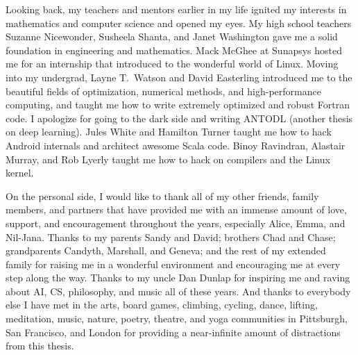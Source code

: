 \begin{acknowledgments}
    Looking back, my teachers and mentors earlier in my life
    ignited my interests in mathematics and computer science
    and opened my eyes.
    My high school teachers
    Suzanne Nicewonder,
    Susheela Shanta, and
    Janet Washington gave me a solid foundation
    in engineering and mathematics.
    Mack McGhee at Sunapsys hosted me for an
    internship that introduced to the wonderful
    world of Linux.
    Moving into my undergrad,
    Layne T.~Watson and David Easterling
    introduced me to the beautiful fields
    of optimization, numerical methods, and
    high-performance computing, and taught me how to
    write extremely optimized and robust Fortran code.
    I apologize for going to the dark side and writing
    ANTODL (another thesis on deep learning).
    Jules White and Hamilton Turner taught me how
    to hack Android internals and architect awesome Scala code.
    Binoy Ravindran, Alastair Murray, and Rob Lyerly
    taught me how to hack on compilers
    and the Linux kernel.

    On the personal side, I would like to thank all of my
    other friends, family members, and partners that
    have provided me with an immense amount of love,
    support, and encouragement throughout the years,
    especially Alice, Emma, and Nil-Jana.
    Thanks to my parents Sandy and David;
    brothers Chad and Chase;
    grandparents Candyth, Marshall, and Geneva;
    and the rest of my extended family
    for raising me in a wonderful environment and
    encouraging me at every step along the way.
    Thanks to my uncle Dan Dunlap for inspiring me and
    raving about AI, CS, philosophy, and music all of these years.
    And thanks to everybody else I have met in the
    arts,
    board games,
    climbing,
    cycling,
    dance,
    lifting,
    meditation,
    music,
    nature,
    poetry,
    theatre, and
    yoga
    communities in Pittsburgh, San Francisco, and London for
    providing a near-infinite amount of distractions from
    this thesis.
\end{acknowledgments}
